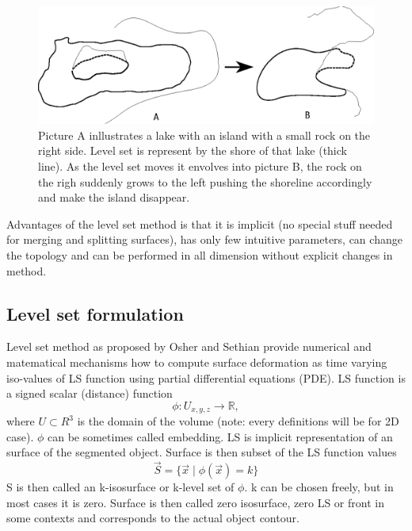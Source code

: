 \begin{enumerate}
\begin{figure}
    \centering
    \includegraphics[width=15cm]{data/shore}
    \caption[Shore illustration of moving level set]{Picture A inllustrates a lake with an island with a small rock on the right side. Level set is represent by the shore of that lake (thick line). As the level set moves it envolves into picture B, the rock on the righ suddenly grows to the left pushing the shoreline accordingly and make the island disappear.}
    \label{fg:shore}
\end{figure}

Advantages of the level set method is that it is implicit (no special stuff needed for merging and splitting surfaces), has only few intuitive parameters, can change the topology and can be performed in all dimension without explicit changes in method. 

\end{enumerate}

\subsection{Level set formulation}

Level set method as proposed by Osher and Sethian \cite{sethianLS} provide numerical and matematical mechanisms how to compute surface deformation as time varying iso-values of LS function using partial differential equations (PDE). 
LS function is a signed scalar (distance) function 
\begin{equation}
\phi : U_{x,y,z} \rightarrow \mathbb R,
\end{equation}
where $U \subset R^3$ is the domain of the volume (note: every definitions will be for 2D case). $\phi$ can be sometimes called embedding. LS is implicit representation of an surface of the segmented object. Surface is then subset of the LS function values
\begin{equation}
\vec{S} = \{\vec{x}\mid \phi(\vec{x}) = k\}
\end{equation}
S is then called an k-isosurface or k-level set of $\phi$. k can be chosen freely, but in most cases it is zero. Surface is then called zero isosurface, zero LS or front in some contexts and corresponds to the actual object contour. 

